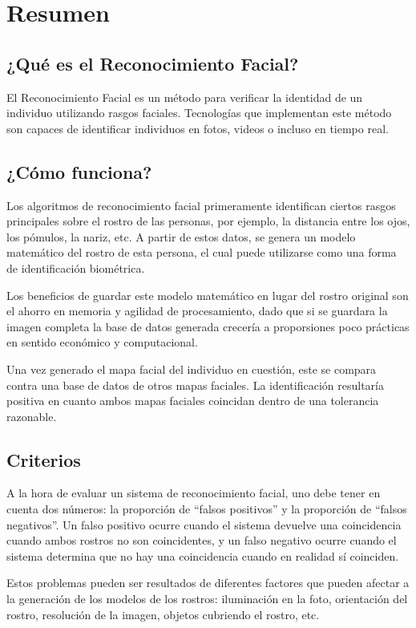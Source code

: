 \chapter{Resumen}

\section{¿Qué es el Reconocimiento Facial?}

El Reconocimiento Facial es un método para verificar la identidad de un individuo utilizando rasgos faciales. Tecnologías que implementan este método son capaces de identificar individuos en fotos, videos o incluso en tiempo real.

\section{¿Cómo funciona?}

Los algoritmos de reconocimiento facial primeramente identifican ciertos rasgos principales sobre el rostro de las personas, por ejemplo, la distancia entre los ojos, los pómulos, la nariz, etc. A partir de estos datos, se genera un modelo matemático del rostro de esta persona, el cual puede utilizarse como una forma de identificación biométrica.

Los beneficios de guardar este modelo matemático en lugar del rostro original son el ahorro en memoria y agilidad de procesamiento, dado que si se guardara la imagen completa la base de datos generada crecería a proporsiones poco prácticas en sentido económico y computacional.

Una vez generado el mapa facial del individuo en cuestión, este se compara contra una base de datos de otros mapas faciales. La identificación resultaría positiva en cuanto ambos mapas faciales coincidan dentro de una tolerancia razonable.

\section{Criterios}

A la hora de evaluar un sistema de reconocimiento facial, uno debe tener en cuenta dos números: la proporción de ``falsos positivos'' y la proporción de ``falsos negativos''. Un falso positivo ocurre cuando el sistema devuelve una coincidencia cuando ambos rostros no son coincidentes, y un falso negativo ocurre cuando el sistema determina que no hay una coincidencia cuando en realidad sí coinciden.

Estos problemas pueden ser resultados de diferentes factores que pueden afectar a la generación de los modelos de los rostros: iluminación en la foto, orientación del rostro, resolución de la imagen, objetos cubriendo el rostro, etc.